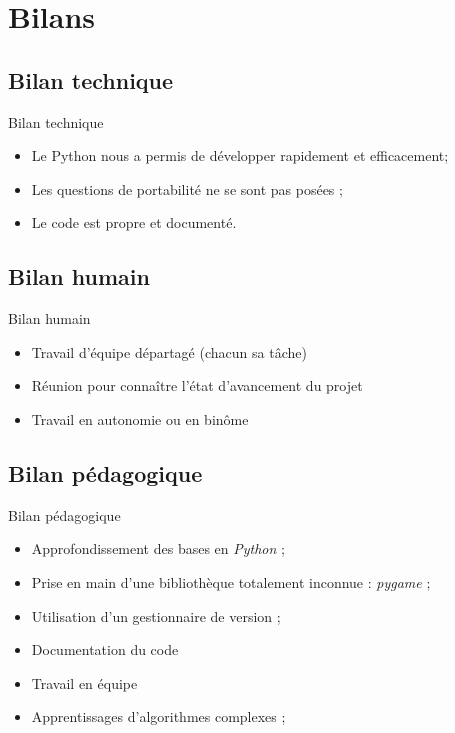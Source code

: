 \documentclass{beamer}
\begin{document}
\section{Bilans}
\subsection{Bilan technique}
	\begin{frame}{Bilan technique}
		\begin{itemize}
		\setlength{\itemsep}{0.3cm}
			\item Le Python nous a permis de développer rapidement et efficacement;
			\item Les questions de portabilité ne se sont pas posées ;
			\item Le code est propre et documenté.
		\end{itemize}
	\end{frame}
\subsection{Bilan humain}
	\begin{frame}{Bilan humain}
		\begin{itemize}
			\item Travail d'équipe départagé (chacun sa tâche)
			\item Réunion pour connaître l'état d'avancement du projet
			\vspace{1cm}
			\item Travail en autonomie ou en binôme
		\end{itemize}
	\end{frame}
\subsection{Bilan pédagogique}
	\begin{frame}{Bilan pédagogique}
		\begin{itemize}
		\setlength{\itemsep}{0.3cm}
			\item Approfondissement des bases en \emph{Python} ;
			\item Prise en main d'une bibliothèque totalement inconnue :
			\emph{pygame} ;
			\vspace{1cm}
			\item Utilisation d'un gestionnaire de version ;
			\item Documentation du code
			\item Travail en équipe
            \item Apprentissages d'algorithmes complexes ;
		\end{itemize}
	\end{frame}
\end{document}
